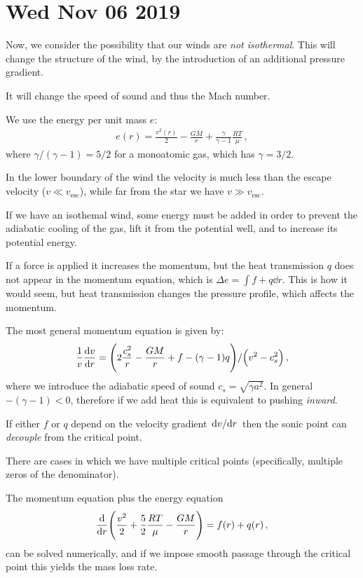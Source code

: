 \documentclass[main.tex]{subfiles}
\begin{document}
\section*{Wed Nov 06 2019}

Now, we consider the possibility that our winds are \emph{not isothermal}.
This will change the structure of the wind, by the introduction of an additional pressure gradient.

It will change the speed of sound and thus the Mach number.

We use the energy per unit mass \(e\): 
%
\begin{align}
  e(r) = \frac{v^2(r)}{2} - \frac{GM}{r} + \frac{\gamma }{\gamma -1} \frac{RT}{\mu }
\,,
\end{align}
%
where \(\gamma / (\gamma -1) = 5/2\) for a monoatomic gas, which has \(\gamma = 3/2\).

In the lower boundary of the wind the velocity is much less than the escape velocity (\(v \ll v _{\text{esc}}\)), while far from the star we have \(v \gg v _{\text{esc}}\).


If we have an isothemal wind, some energy must be added in order to prevent the adiabatic cooling of the gas, lift it from the potential well, and to increase its potential energy.

If a force is applied it increases the momentum, but the heat transmission \(q\) does not appear in the momentum equation, which is \(\Delta e = \int f + q \dd{r} \).
This is how it would seem, but heat transmission changes the pressure profile, which affects the momentum.

The most general momentum equation is given by: 
%
\begin{align}
  \frac{1}{v} \dv{v}{r} = \qty(2 \frac{c_s^2}{r} - \frac{GM}{r} + f -(\gamma - 1) q) / \qty(v^2- c_s^2)
\,,
\end{align}
%
where we introduce the adiabatic speed of sound \(c_s = \sqrt{\gamma a^2} \). In general \(- (\gamma - 1)<0\), therefore if we add heat this is equivalent to pushing \emph{inward}.

If either \(f\) or \(q\) depend on the velocity gradient \(\dv*{v}{r}\) then the sonic point can \emph{decouple} from the critical point.

There are cases in which we have multiple critical points (specifically, multiple zeros of the denominator).

The momentum equation plus the energy equation 
%
\begin{align}
  \dv{}{r} \qty(\frac{v^2}{2} + \frac{5}{2} \frac{RT}{\mu } - \frac{GM}{r}) = f(r) + q(r)
\,,
\end{align}
%
can be solved numerically, and if we impose smooth passage through the critical point this yields the mass loss rate.
\end{document}
